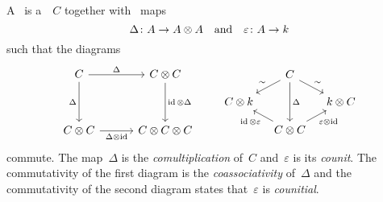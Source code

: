 \begin{definition}
  A~ is a~~$C$ together with~ maps
  \[
    \Delta \colon A \to A \mathbin{\otimes} A
    \quad\text{and}\quad
    \varepsilon \colon A \to k
  \]
  such that the diagrams
  \[
    \begin{tikzcd}[column sep = 30pt, row sep = 35pt]
        C
        \arrow{r}[above]{\Delta}
        \arrow{d}[left]{\Delta}
      & C \tensor C
        \arrow{d}[right]{\id \tensor \Delta}
      \\
        C \tensor C
        \arrow{r}[below]{\Delta \tensor \id}
      & C \tensor C \tensor C
    \end{tikzcd}
    \quad\quad
    \begin{tikzcd}[column sep = 10pt, row sep = 10pt]
        {}
      & C
        \arrow{dl}[above left]{\sim}
        \arrow{dd}{\Delta}
        \arrow{dr}[above right]{\sim}
      & {}
      \\
        C \tensor k
      & {}
      & k \tensor C
      \\
        {}
      & C \tensor C
        \arrow{ul}[below left]{\id \tensor \varepsilon}
        \arrow{ur}[below right]{\varepsilon \tensor \id}
      & {}
    \end{tikzcd}
  \]
  commute.
  The map~$\Delta$ is the \emph{comultiplication} of~$C$ and~$\varepsilon$ is its \emph{counit}.
  The commutativity of the first diagram is the \emph{coassociativity} of~$\Delta$ and the commutativity of the second diagram states that~$\varepsilon$ is \emph{counitial}.
\end{definition}


%   
% 
% 


